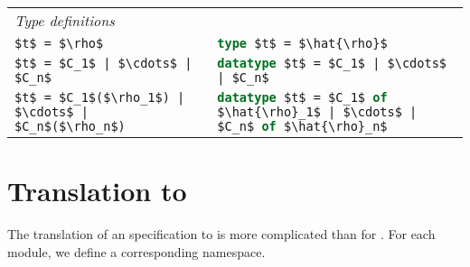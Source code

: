 \begin{table}[tp]
\begin{center}
\begin{tabular}{|l|p{3in}|}
      \hline
      \textit{Type definitions} & \\[0.25em]
      \lstinline[language=ASDL,mathescape=true]@$t$ = $\rho$@
        & \lstinline[language=SML,mathescape=true]!type $t$ = $\hat{\rho}$! \\[0.5em]
      \lstinline[language=ASDL,mathescape=true]@$t$ = $C_1$ | $\cdots$ | $C_n$@
        & \lstinline[language=SML,mathescape=true]!datatype $t$ = $C_1$ | $\cdots$ | $C_n$! \\[0.5em]
      \lstinline[language=ASDL,mathescape=true]@$t$ = $C_1$($\rho_1$) | $\cdots$ | $C_n$($\rho_n$)@
        & \lstinline[language=SML,mathescape=true]!datatype $t$ = $C_1$ of $\hat{\rho}_1$ | $\cdots$ | $C_n$ of $\hat{\rho}_n$! \\[0.25em]
      \hline
    \end{tabular}%
  \end{center}%
\end{table}%

\section{Translation to \Cplusplus{}}

The translation of an \asdl{} specification to \Cplusplus{} is more complicated than for \sml{}.
For each \asdl{} module, we define a corresponding \Cplusplus{} namespace.

